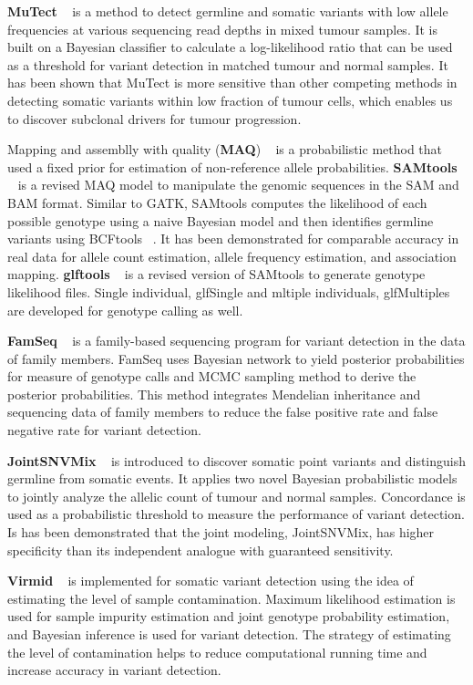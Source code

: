 \documentclass[11pt,reqno]{amsart}
\begin{document}
\textbf{MuTect} ~\citep{Cibulskis2013} is a method to detect germline and somatic variants with low allele frequencies at various sequencing read depths in mixed tumour samples.
It is built on a Bayesian classifier to calculate a log-likelihood ratio that can be used as a threshold for variant detection in matched tumour and normal samples.
It has been shown that MuTect is more sensitive than other competing methods in detecting somatic variants within low fraction of tumour cells, which enables us to discover subclonal drivers for tumour progression.

Mapping and assemblly with quality (\textbf{MAQ}) ~\citep{Li2008} is a probabilistic method that used a fixed prior for estimation of non-reference allele probabilities.
\textbf{SAMtools} ~\citep{Li2009a} is a revised MAQ model to manipulate the genomic sequences in the SAM and BAM format.
Similar to GATK, SAMtools computes the likelihood of each possible genotype using a naive Bayesian model and then identifies germline variants using BCFtools ~\citep{li2011statistical}.
It has been demonstrated for comparable accuracy in real data for allele count estimation, allele frequency estimation, and association mapping.
\textbf{glftools} ~\citep{abecasis2010} is a revised version of SAMtools to generate genotype likelihood files.
Single individual, glfSingle and mltiple individuals, glfMultiples are developed for genotype calling as well.

\textbf{FamSeq} ~\citep{Peng2013} is a family-based sequencing program for variant detection in the data of family members.
FamSeq uses Bayesian network to yield posterior probabilities for measure of genotype calls and MCMC sampling method to derive the posterior probabilities.
This method integrates Mendelian inheritance and sequencing data of family members to reduce the false positive rate and false negative rate for variant detection.

\textbf{JointSNVMix} ~\citep{Roth2012} is introduced to discover somatic point variants and distinguish germline from somatic events.
It applies two novel Bayesian probabilistic models to jointly analyze the allelic count of tumour and normal samples.
Concordance is used as a probabilistic threshold to measure the performance of variant detection.
Is has been demonstrated that the joint modeling, JointSNVMix, has higher specificity than its independent analogue with guaranteed sensitivity.

\textbf{Virmid} ~\citep{Kim2013} is implemented for somatic variant detection using the idea of estimating the level of sample contamination.
Maximum likelihood estimation is used for sample impurity estimation and joint genotype probability estimation, and Bayesian inference is used for variant detection.
The strategy of estimating the level of contamination helps to reduce computational running time and increase accuracy in variant detection.
\end{document}
